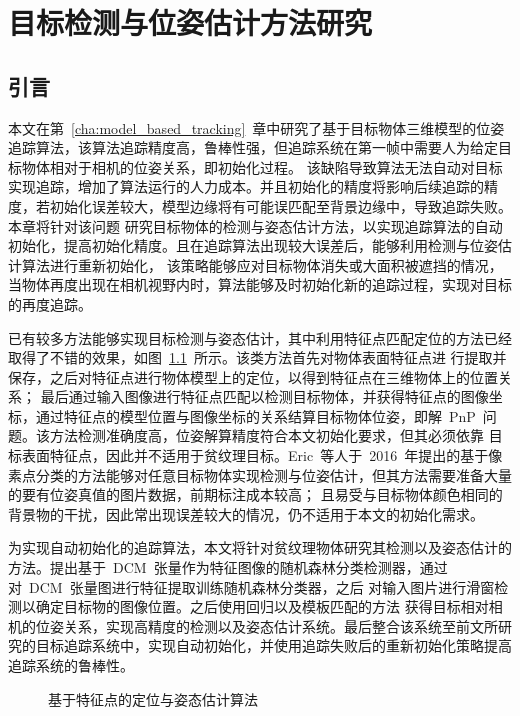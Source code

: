 \chapter{目标检测与位姿估计方法研究}
\label{cha:detect_pose_estimation}
\section{引言}
\label{sec:detect_intro}
本文在第~\ref{cha:model_based_tracking}~章中研究了基于目标物体三维模型的位姿追踪算法，该算法追踪精度高，鲁棒性强，但追踪系统在第一帧中需要人为给定目标物体相对于相机的位姿关系，即初始化过程。
该缺陷导致算法无法自动对目标实现追踪，增加了算法运行的人力成本。并且初始化的精度将影响后续追踪的精度，若初始化误差较大，模型边缘将有可能误匹配至背景边缘中，导致追踪失败。本章将针对该问题
研究目标物体的检测与姿态估计方法，以实现追踪算法的自动初始化，提高初始化精度。且在追踪算法出现较大误差后，能够利用检测与位姿估计算法进行重新初始化，
该策略能够应对目标物体消失或大面积被遮挡的情况，当物体再度出现在相机视野内时，算法能够及时初始化新的追踪过程，实现对目标的再度追踪。

已有较多方法能够实现目标检测与姿态估计，其中利用特征点匹配定位的方法已经取得了不错的效果\cite{PiImplementation3DPose}，如图~\ref{fig:chap04:detect_feature_pose_estimation}~所示。该类方法首先对物体表面特征点进
行提取并保存，之后对特征点进行物体模型上的定位，以得到特征点在三维物体上的位置关系；
最后通过输入图像进行特征点匹配以检测目标物体，并获得特征点的图像坐标，通过特征点的模型位置与图像坐标的关系结算目标物体位姿，即解~PnP~问题。该方法检测准确度高，位姿解算精度符合本文初始化要求，但其必须依靠
目标表面特征点，因此并不适用于贫纹理目标。Eric~等人\cite{BrachmannUncertaintyDriven6DPose2016}于~2016~年提出的基于像素点分类的方法能够对任意目标物体实现检测与位姿估计，但其方法需要准备大量的要有位姿真值的图片数据，前期标注成本较高；
且易受与目标物体颜色相同的背景物的干扰，因此常出现误差较大的情况，仍不适用于本文的初始化需求。

为实现自动初始化的追踪算法，本文将针对贫纹理物体研究其检测以及姿态估计的方法。提出基于~DCM~张量作为特征图像的随机森林分类检测器，通过对~DCM~张量图进行特征提取训练随机森林分类器，之后
对输入图片进行滑窗检测以确定目标物的图像位置。之后使用回归以及模板匹配的方法
获得目标相对相机的位姿关系，实现高精度的检测以及姿态估计系统。最后整合该系统至前文所研究的目标追踪系统中，实现自动初始化，并使用追踪失败后的重新初始化策略提高追踪系统的鲁棒性。

\begin{figure}[t] %
    \centering%
    \vskip0.2cm
    \quad
    \caption{基于特征点的定位与姿态估计算法}
    \label{fig:chap04:detect_feature_pose_estimation}
  \end{figure}


